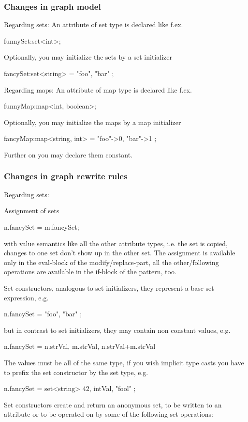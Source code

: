 \subsubsection{Changes in graph model}

Regarding sets:
An attribute of set type is declared like f.ex.
\begin{grgenlet}
funnySet:set<int>;
\end{grgenlet}
Optionally, you may initialize the sets by a set initializer
\begin{grgenlet}
fancySet:set<string> = { "foo", "bar" };
\end{grgenlet}

Regarding maps:
An attribute of map type is declared like f.ex.
\begin{grgenlet}
funnyMap:map<int, boolean>;
\end{grgenlet}
Optionally, you may initialize the maps by a map initializer
\begin{grgenlet}
fancyMap:map<string, int> = { "foo"->0, "bar"->1 };
\end{grgenlet}

Further on you may declare them constant.

\subsubsection{Changes in graph rewrite rules}

Regarding sets:

Assignment of sets
\begin{grgenlet}
n.fancySet = m.fancySet;
\end{grgenlet}
with value semantics like all the other attribute types, 
i.e. the set is copied, changes to one set don't show up in the other set.
The assignment is available only in the eval-block of the modify/replace-part, 
all the other/following operations are available in the if-block of the pattern, too.

Set constructors, analogous to set initializers, they represent a base set expression, e.g. 
\begin{grgenlet}
n.fancySet = { "foo", "bar" };
\end{grgenlet}
but in contrast to set initializers, they may contain non constant values, e.g. 
\begin{grgenlet}
n.fancySet = { n.strVal, m.strVal, n.strVal+m.strVal }
\end{grgenlet}
The values must be all of the same type, if you wish implicit type casts
you have to prefix the set constructor by the set type, e.g.
\begin{grgenlet}
n.fancySet = set<string>{ 42, intVal, "fool" };
\end{grgenlet}
Set constructors create and return an anonymous set,
to be written to an attribute or to be operated on by some of the following set operations:

